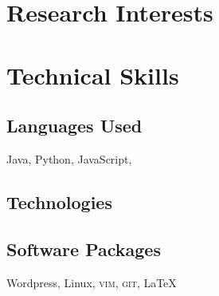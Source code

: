 \documentclass[11pt,a4paper,sans]{moderncv} %
\begin{document}
\section{Research Interests}


\section{Technical Skills}

\subsection{Languages Used}

\cvitem{} {Java, Python, JavaScript, }

\subsection{Technologies}


\subsection{Software Packages}

\cvitem{} {Wordpress, Linux, \textsc{vim}, \textsc{git}, \LaTeX}



\end{document}
